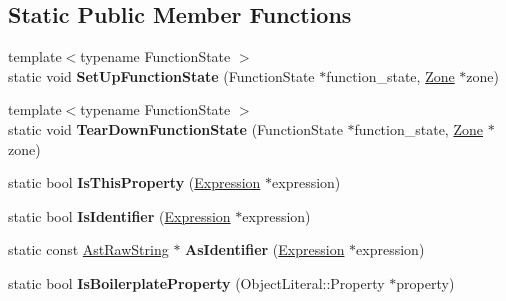 \subsection*{Static Public Member Functions}
\begin{DoxyCompactItemize}
\item 
\hypertarget{classv8_1_1internal_1_1_parser_traits_a56be6f166ec76157bdcdb0cc96d701e3}{}{\footnotesize template$<$typename Function\+State $>$ }\\static void {\bfseries Set\+Up\+Function\+State} (Function\+State $\ast$function\+\_\+state, \hyperlink{classv8_1_1internal_1_1_zone}{Zone} $\ast$zone)\label{classv8_1_1internal_1_1_parser_traits_a56be6f166ec76157bdcdb0cc96d701e3}

\item 
\hypertarget{classv8_1_1internal_1_1_parser_traits_a83bf31eb1a2b76ca9fab61b166137f61}{}{\footnotesize template$<$typename Function\+State $>$ }\\static void {\bfseries Tear\+Down\+Function\+State} (Function\+State $\ast$function\+\_\+state, \hyperlink{classv8_1_1internal_1_1_zone}{Zone} $\ast$zone)\label{classv8_1_1internal_1_1_parser_traits_a83bf31eb1a2b76ca9fab61b166137f61}

\item 
\hypertarget{classv8_1_1internal_1_1_parser_traits_a18441854b73ca5e19d9e0e1b5bfb60b6}{}static bool {\bfseries Is\+This\+Property} (\hyperlink{classv8_1_1internal_1_1_expression}{Expression} $\ast$expression)\label{classv8_1_1internal_1_1_parser_traits_a18441854b73ca5e19d9e0e1b5bfb60b6}

\item 
\hypertarget{classv8_1_1internal_1_1_parser_traits_afd0b2cb75bc97aea8797e0dedcc1a4a2}{}static bool {\bfseries Is\+Identifier} (\hyperlink{classv8_1_1internal_1_1_expression}{Expression} $\ast$expression)\label{classv8_1_1internal_1_1_parser_traits_afd0b2cb75bc97aea8797e0dedcc1a4a2}

\item 
\hypertarget{classv8_1_1internal_1_1_parser_traits_a1b9ce47fe3ddaedac13204176e241805}{}static const \hyperlink{classv8_1_1internal_1_1_ast_raw_string}{Ast\+Raw\+String} $\ast$ {\bfseries As\+Identifier} (\hyperlink{classv8_1_1internal_1_1_expression}{Expression} $\ast$expression)\label{classv8_1_1internal_1_1_parser_traits_a1b9ce47fe3ddaedac13204176e241805}

\item 
\hypertarget{classv8_1_1internal_1_1_parser_traits_a578c0594771c3ec77513ad986e5e57a4}{}static bool {\bfseries Is\+Boilerplate\+Property} (Object\+Literal\+::\+Property $\ast$property)\label{classv8_1_1internal_1_1_parser_traits_a578c0594771c3ec77513ad986e5e57a4}


\end{DoxyCompactItemize}
